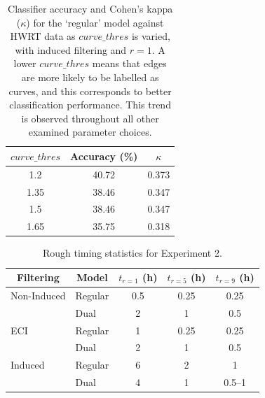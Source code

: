 \documentclass{mpaper}
\begin{document}
\begin{table}
	\centering
	
	\begin{tabular}{ccc}
		\toprule
		$\mathit{curve\_thres}$ & Accuracy (\si{\percent}) & $\kappa$ \\
		\midrule
		1.2 & 40.72 & 0.373 \\
		1.35 & 38.46 & 0.347 \\
		1.5 & 38.46 & 0.347 \\
		1.65 & 35.75 & 0.318 \\
		\bottomrule
	\end{tabular}
	
	\vspace{0.5em}
	\caption{
		Classifier accuracy and Cohen's kappa ($\kappa$) for the `regular' model against HWRT data as $\mathit{curve\_thres}$ is varied, with induced filtering and $r=1$.
		A lower $\mathit{curve\_thres}$ means that edges are more likely to be labelled as curves, and this corresponds to better classification performance.
		This trend is observed throughout all other examined parameter choices.
		\label{tab:exp2-thres}
	}
\end{table}

\begin{table}

\centering
\begin{tabular}{llccc}
	\toprule
	\multicolumn{1}{c}{Filtering} & \multicolumn{1}{c}{Model} & $t_{r=1}$ (\si{\hour}) & $t_{r=5}$ (\si{\hour}) & $t_{r=9}$ (\si{\hour}) \\
	\midrule
	
	Non-Induced & Regular & 0.5 & 0.25 & 0.25 \\
	& Dual & 2 & 1 & 0.5 \\
	
	ECI & Regular & 1 & 0.25 & 0.25 \\
	& Dual & 2 & 1 & 0.5 \\
	
	Induced & Regular & 6 & 2 & 1 \\
	& Dual & 4 & 1 & 0.5--1 \\
	
	\bottomrule
\end{tabular}
	
\vspace{0.5em}
\caption{
	Rough timing statistics for Experiment 2.
	\label{tab:ex2-times}
}
\end{table}
\end{document}
